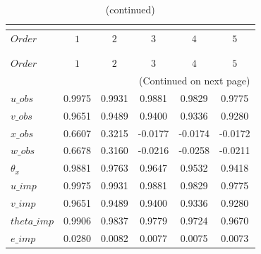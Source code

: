  
\begin{center}
\begin{longtable}{lccccc} 
\caption{COEFFICIENTS OF AUTOCORRELATION}\\
 \label{Table:th_autocorr_matrix}\\
\toprule 
$Order       $	 & 	 $         1$	 & 	 $         2$	 & 	 $         3$	 & 	 $         4$	 & 	 $         5$\\
\midrule \endfirsthead 
\caption{(continued)}\\
 \toprule \\ 
$Order       $	 & 	 $         1$	 & 	 $         2$	 & 	 $         3$	 & 	 $         4$	 & 	 $         5$\\
\midrule \endhead 
\midrule \multicolumn{6}{r}{(Continued on next page)} \\ \bottomrule \endfoot 
\bottomrule \endlastfoot 
$u\_obs      $	 & 	    0.9975	 & 	    0.9931	 & 	    0.9881	 & 	    0.9829	 & 	    0.9775 \\ 
$v\_obs      $	 & 	    0.9651	 & 	    0.9489	 & 	    0.9400	 & 	    0.9336	 & 	    0.9280 \\ 
$x\_obs      $	 & 	    0.6607	 & 	    0.3215	 & 	   -0.0177	 & 	   -0.0174	 & 	   -0.0172 \\ 
$w\_obs      $	 & 	    0.6678	 & 	    0.3160	 & 	   -0.0216	 & 	   -0.0258	 & 	   -0.0211 \\ 
${\theta_x}  $	 & 	    0.9881	 & 	    0.9763	 & 	    0.9647	 & 	    0.9532	 & 	    0.9418 \\ 
$u\_imp      $	 & 	    0.9975	 & 	    0.9931	 & 	    0.9881	 & 	    0.9829	 & 	    0.9775 \\ 
$v\_imp      $	 & 	    0.9651	 & 	    0.9489	 & 	    0.9400	 & 	    0.9336	 & 	    0.9280 \\ 
$theta\_imp  $	 & 	    0.9906	 & 	    0.9837	 & 	    0.9779	 & 	    0.9724	 & 	    0.9670 \\ 
$e\_imp      $	 & 	    0.0280	 & 	    0.0082	 & 	    0.0077	 & 	    0.0075	 & 	    0.0073 \\ 
\end{longtable}
 \end{center}
